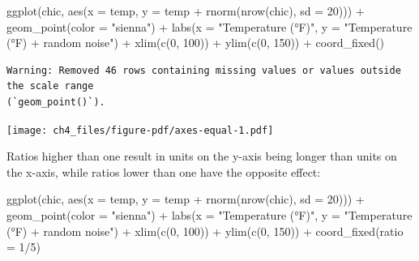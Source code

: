 \documentclass[
  letterpaper,
]{scrbook}
\newenvironment{Shaded}{\begin{snugshade}}{\end{snugshade}}
\newcommand{\AttributeTok}[1]{\textcolor[rgb]{0.40,0.45,0.13}{#1}}
\newcommand{\DecValTok}[1]{\textcolor[rgb]{0.68,0.00,0.00}{#1}}
\newcommand{\FunctionTok}[1]{\textcolor[rgb]{0.28,0.35,0.67}{#1}}
\newcommand{\NormalTok}[1]{\textcolor[rgb]{0.00,0.23,0.31}{#1}}
\newcommand{\SpecialCharTok}[1]{\textcolor[rgb]{0.37,0.37,0.37}{#1}}
\newcommand{\StringTok}[1]{\textcolor[rgb]{0.13,0.47,0.30}{#1}}
\begin{document}
\begin{Shaded}
\begin{Highlighting}[]
\FunctionTok{ggplot}\NormalTok{(chic, }\FunctionTok{aes}\NormalTok{(}\AttributeTok{x =}\NormalTok{ temp, }\AttributeTok{y =}\NormalTok{ temp }\SpecialCharTok{+} \FunctionTok{rnorm}\NormalTok{(}\FunctionTok{nrow}\NormalTok{(chic), }\AttributeTok{sd =} \DecValTok{20}\NormalTok{))) }\SpecialCharTok{+}
  \FunctionTok{geom\_point}\NormalTok{(}\AttributeTok{color =} \StringTok{"sienna"}\NormalTok{) }\SpecialCharTok{+}
  \FunctionTok{labs}\NormalTok{(}\AttributeTok{x =} \StringTok{"Temperature (°F)"}\NormalTok{, }\AttributeTok{y =} \StringTok{"Temperature (°F) + random noise"}\NormalTok{) }\SpecialCharTok{+}
  \FunctionTok{xlim}\NormalTok{(}\FunctionTok{c}\NormalTok{(}\DecValTok{0}\NormalTok{, }\DecValTok{100}\NormalTok{)) }\SpecialCharTok{+} \FunctionTok{ylim}\NormalTok{(}\FunctionTok{c}\NormalTok{(}\DecValTok{0}\NormalTok{, }\DecValTok{150}\NormalTok{)) }\SpecialCharTok{+}
  \FunctionTok{coord\_fixed}\NormalTok{()}
\end{Highlighting}
\end{Shaded}

\begin{verbatim}
Warning: Removed 46 rows containing missing values or values outside the scale range
(`geom_point()`).
\end{verbatim}

\texttt{[image: ch4\_files/figure-pdf/axes-equal-1.pdf]}

Ratios higher than one result in units on the y-axis being longer than
units on the x-axis, while ratios lower than one have the opposite
effect:

\begin{Shaded}
\begin{Highlighting}[]
\FunctionTok{ggplot}\NormalTok{(chic, }\FunctionTok{aes}\NormalTok{(}\AttributeTok{x =}\NormalTok{ temp, }\AttributeTok{y =}\NormalTok{ temp }\SpecialCharTok{+} \FunctionTok{rnorm}\NormalTok{(}\FunctionTok{nrow}\NormalTok{(chic), }\AttributeTok{sd =} \DecValTok{20}\NormalTok{))) }\SpecialCharTok{+}
  \FunctionTok{geom\_point}\NormalTok{(}\AttributeTok{color =} \StringTok{"sienna"}\NormalTok{) }\SpecialCharTok{+}
  \FunctionTok{labs}\NormalTok{(}\AttributeTok{x =} \StringTok{"Temperature (°F)"}\NormalTok{, }\AttributeTok{y =} \StringTok{"Temperature (°F) + random noise"}\NormalTok{) }\SpecialCharTok{+}
  \FunctionTok{xlim}\NormalTok{(}\FunctionTok{c}\NormalTok{(}\DecValTok{0}\NormalTok{, }\DecValTok{100}\NormalTok{)) }\SpecialCharTok{+} \FunctionTok{ylim}\NormalTok{(}\FunctionTok{c}\NormalTok{(}\DecValTok{0}\NormalTok{, }\DecValTok{150}\NormalTok{)) }\SpecialCharTok{+}
  \FunctionTok{coord\_fixed}\NormalTok{(}\AttributeTok{ratio =} \DecValTok{1}\SpecialCharTok{/}\DecValTok{5}\NormalTok{)}
\end{Highlighting}
\end{Shaded}
\end{document}

